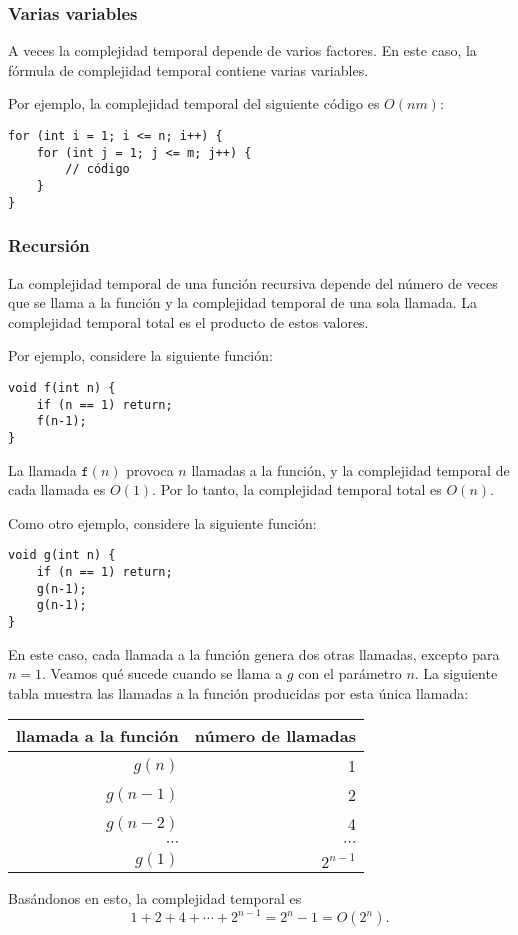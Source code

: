 \subsubsection*{Varias variables}

A veces la complejidad temporal depende de
varios factores.
En este caso, la fórmula de complejidad temporal
contiene varias variables.

Por ejemplo, la complejidad temporal del
siguiente código es $O(nm)$:

\begin{lstlisting}
for (int i = 1; i <= n; i++) {
    for (int j = 1; j <= m; j++) {
        // código
    }
}
\end{lstlisting}

\subsubsection*{Recursión}

La complejidad temporal de una función recursiva
depende del número de veces que se llama a la función
y la complejidad temporal de una sola llamada.
La complejidad temporal total es el producto de
estos valores.

Por ejemplo, considere la siguiente función:
\begin{lstlisting}
void f(int n) {
    if (n == 1) return;
    f(n-1);
}
\end{lstlisting}
La llamada $\texttt{f}(n)$ provoca $n$ llamadas a la función,
y la complejidad temporal de cada llamada es $O(1)$.
Por lo tanto, la complejidad temporal total es $O(n)$.

Como otro ejemplo, considere la siguiente función:
\begin{lstlisting}
void g(int n) {
    if (n == 1) return;
    g(n-1);
    g(n-1);
}
\end{lstlisting}
En este caso, cada llamada a la función genera dos otras
llamadas, excepto para $n=1$.
Veamos qué sucede cuando se llama a $g$
con el parámetro $n$.
La siguiente tabla muestra las llamadas a la función
producidas por esta única llamada:
\begin{center}
\begin{tabular}{rr}
llamada a la función & número de llamadas \\
\hline
$g(n)$ & 1 \\
$g(n-1)$ & 2 \\
$g(n-2)$ & 4 \\
$\cdots$ & $\cdots$ \\
$g(1)$ & $2^{n-1}$ \\
\end{tabular}
\end{center}
Basándonos en esto, la complejidad temporal es
\[1+2+4+\cdots+2^{n-1} = 2^n-1 = O(2^n).\]

